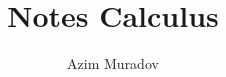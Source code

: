 \documentclass[11pt,a4paper,titlepage]{article}
\title{Notes Calculus}
\author{Azim Muradov}
\begin{document}
\maketitle
\blindtext
\end{document}
